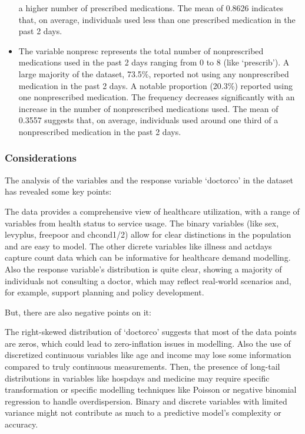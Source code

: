 \documentclass[
]{article}
\begin{document}
\begin{itemize}
  a higher number of prescribed medications. The mean of 0.8626
  indicates that, on average, individuals used less than one prescribed
  medication in the past 2 days.
\item
  The variable nonpresc represents the total number of nonprescribed
  medications used in the past 2 days ranging from 0 to 8 (like
  `prescrib'). A large majority of the dataset, 73.5\%, reported not
  using any nonprescribed medication in the past 2 days. A notable
  proportion (20.3\%) reported using one nonprescribed medication. The
  frequency decreases significantly with an increase in the number of
  nonprescribed medications used. The mean of 0.3557 suggests that, on
  average, individuals used around one third of a nonprescribed
  medication in the past 2 days.
\end{itemize}

\subsubsection{Considerations}\label{considerations}

The analysis of the variables and the response variable `doctorco' in
the dataset has revealed some key points:

The data provides a comprehensive view of healthcare utilization, with a
range of variables from health status to service usage. The binary
variables (like sex, levyplus, freepoor and chcond1/2) allow for clear
distinctions in the population and are easy to model. The other dicrete
variables like illness and actdays capture count data which can be
informative for healthcare demand modelling. Also the response
variable's distribution is quite clear, showing a majority of
individuals not consulting a doctor, which may reflect real-world
scenarios and, for example, support planning and policy development.

But, there are also negative points on it:

The right-skewed distribution of `doctorco' suggests that most of the
data points are zeros, which could lead to zero-inflation issues in
modelling. Also the use of discretized continuous variables like age and
income may lose some information compared to truly continuous
measurements. Then, the presence of long-tail distributions in variables
like hospdays and medicine may require specific transformation or
specific modelling techniques like Poisson or negative binomial
regression to handle overdispersion. Binary and discrete variables with
limited variance might not contribute as much to a predictive model's
complexity or accuracy.
\end{document}
